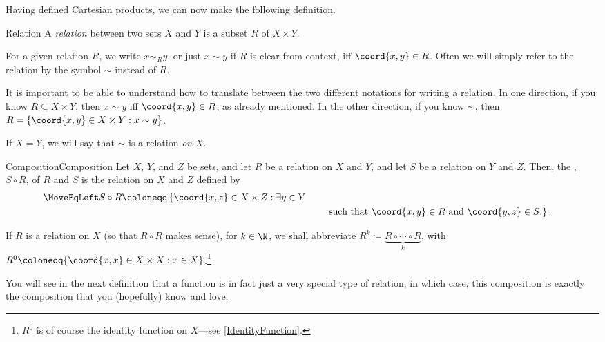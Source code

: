 Having defined Cartesian products, we can now make the following definition.
\begin{dfn}{Relation}{}
A \emph{relation} between two sets $X$ and $Y$ is a subset $R$ of $X\times Y$.
\begin{rmk}
For a given relation $R$, we write $x\sim _Ry$, or just $x\sim y$ if $R$ is clear from context, iff $\coord{x,y}\in R$.  Often we will simply refer to the relation by the symbol $\sim$ instead of $R$.
\end{rmk}
\begin{rmk}
It is important to be able to understand how to translate between the two different notations for writing a relation.  In one direction, if you know $R\subseteq X\times Y$, then $x\sim y$ iff $\coord{x,y}\in R$, as already mentioned.  In the other direction, if you know $\sim$, then $R=\left\{ \coord{x,y}\in X\times Y:x\sim y\right\}$.
\end{rmk}
\begin{rmk}
If $X=Y$, we will say that $\sim$ is a relation \emph{on} $X$.
\end{rmk}
\end{dfn}
\begin{dfn}{Composition}{Composition}
Let $X$, $Y$, and $Z$ be sets, and let $R$ be a relation on $X$ and $Y$, and let $S$ be a relation on $Y$ and $Z$.  Then, the , $S\circ R$, of $R$ and $S$ is the relation on $X$ and $Z$ defined by
\begin{equation}
\begin{split}
\MoveEqLeft
S\circ R\coloneqq \left\{ \coord{x,z}\in X\times Z:\exists y\in Y\right. \\ & \qquad \left. \text{such that }\coord{x,y}\in R\text{ and }\coord{y,z}\in S\text{.}\right\} .
\end{split}
\end{equation}
\begin{rmk}
If $R$ is a relation on $X$ (so that $R\circ R$ makes sense), for $k\in \N$, we shall abbreviate $R^k\coloneqq \underbrace{R\circ \cdots \circ R}_k$, with $R^0\coloneqq \{ \coord{x,x}\in X\times X:x\in X\}$.\footnote{$R^0$ is of course the identity function on $X$---see \cref{IdentityFunction}.}
\end{rmk}
\begin{rmk}
You will see in the next definition that a function is in fact just a very special type of relation, in which case, this composition is exactly the composition that you (hopefully) know and love.
\end{rmk}
\end{dfn}
